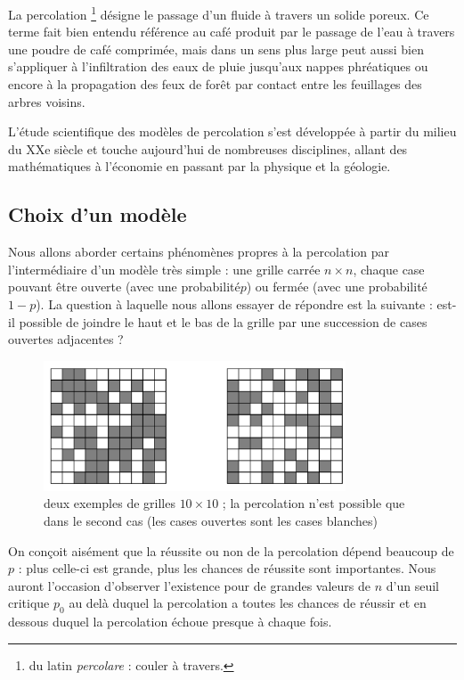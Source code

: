 \exer{}
\setcounter{numques}{0}


La percolation \footnote{du latin \emph{percolare} : couler à travers.} désigne le passage d'un fluide à
travers un solide poreux. Ce terme fait bien entendu référence au café
produit par le passage de l'eau à travers une poudre de café comprimée,
mais dans un sens plus large peut aussi bien s'appliquer à
l'infiltration des eaux de pluie jusqu'aux nappes phréatiques ou encore
à la propagation des feux de forêt par contact entre les feuillages des
arbres voisins.

L'étude scientifique des modèles de percolation s'est développée à
partir du milieu du XXe siècle et touche aujourd'hui de nombreuses
disciplines, allant des mathématiques à l'économie en passant par la
physique et la géologie.

\setcounter{section}{1}
\subsection*{Choix d'un modèle}\label{choix-dun-modele}


Nous allons aborder certains phénomènes propres à la percolation par
l'intermédiaire d'un modèle très simple : une grille carrée $n\times n$,
chaque case pouvant être ouverte (avec une probabilité$p$) ou
fermée (avec une probabilité $1-p$). La question à laquelle nous
allons essayer de répondre est la suivante : est-il possible de joindre
le haut et le bas de la grille par une succession de cases ouvertes
adjacentes ?

\begin{figure}[!htb]
\begin{center}
\includegraphics[width=0.8\textwidth]{illustration_perco.jpg}
\caption{deux exemples de grilles $10\times10$ ; la percolation
n'est possible que dans le second cas (les cases ouvertes sont les cases
blanches) \label{fig1}}
\end{center}
\end{figure}




On conçoit aisément que la réussite ou non de la percolation dépend
beaucoup de $p$ : plus celle-ci est grande, plus les chances de
réussite sont importantes. Nous auront l'occasion d'observer l'existence
pour de grandes valeurs de $n$ d'un seuil critique $p_0$ au delà duquel la percolation a toutes les chances de réussir et en dessous duquel la percolation échoue presque à
chaque fois.

